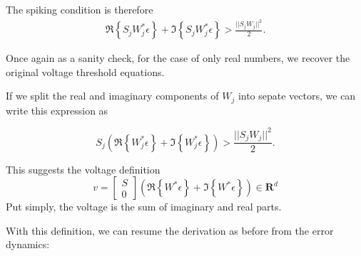 The spiking condition is therefore 
\begin{align*}
\Re \left\{S_jW_j^*\epsilon\right\}
+
\Im \left\{S_jW_j^*\epsilon\right\}
>
\frac{||S_jW_j||^2}{2}.
\end{align*}

Once again as a sanity check, for the case of only real numbers, we recover the original voltage threshold equations. 

If we split the real and imaginary components of $W_j$ into sepate vectors, we can write this expression as

$$
S_j \left( \Re \left\{W_j^* \epsilon\right\} + \Im \left\{W_j^*\epsilon\right\} \right) > \frac{||S_j W_j||^2}{2}.
$$

This suggests the voltage definition
$$
v = 
\begin{bmatrix}S \\ 0\end{bmatrix} \left( \Re\left\{W^*\epsilon\right\} + \Im\left\{W^*\epsilon\right\}\right) \in \mathbf{R}^d
$$
Put simply, the voltage is the sum of imaginary and real parts.


With this definition, we can resume the derivation as before from the error dynamics:


